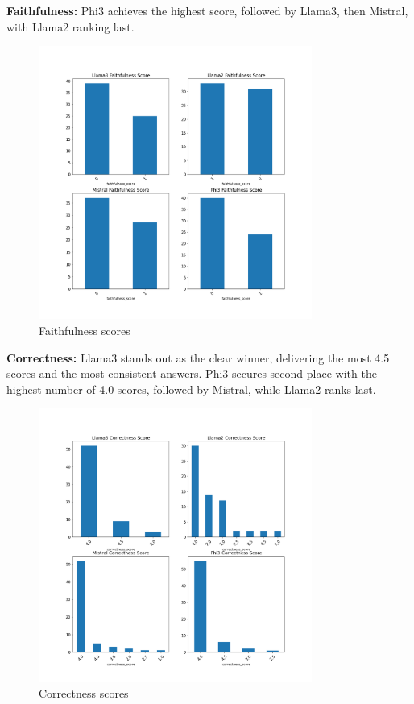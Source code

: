 \documentclass[]{article}
\begin{document}
\textbf{Faithfulness:}
Phi3 achieves the highest score, followed by Llama3, then Mistral, with Llama2 ranking last.
\begin{figure}[H]
    \centering
    \includegraphics[width=0.8\textwidth]{./images/faith_hm.png}
    \caption{Faithfulness scores}
    \label{fig:image_label}
\end{figure}

\textbf{Correctness:}
Llama3 stands out as the clear winner, delivering the most 4.5 scores and the most consistent answers.  
Phi3 secures second place with the highest number of 4.0 scores, followed by Mistral, while Llama2 ranks last.
\begin{figure}[H]
    \centering
    \includegraphics[width=0.8\textwidth]{./images/correct_hm.png}
    \caption{Correctness scores}
    \label{fig:image_label}
\end{figure}
\end{document}
